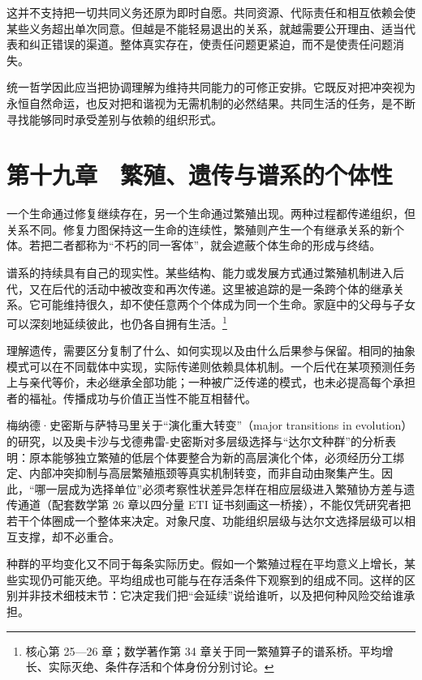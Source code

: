 \documentclass[
  11pt,
  oneside]{book}
\begin{document}
这并不支持把一切共同义务还原为即时自愿。共同资源、代际责任和相互依赖会使某些义务超出单次同意。但越是不能轻易退出的关系，就越需要公开理由、适当代表和纠正错误的渠道。整体真实存在，使责任问题更紧迫，而不是使责任问题消失。

\begingroup{}

统一哲学因此应当把协调理解为维持共同能力的可修正安排。它既反对把冲突视为永恒自然命运，也反对把和谐视为无需机制的必然结果。共同生活的任务，是不断寻找能够同时承受差别与依赖的组织形式。

\par\endgroup

\chapter{第十九章　繁殖、遗传与谱系的个体性}\label{ph-ch-19}

一个生命通过修复继续存在，另一个生命通过繁殖出现。两种过程都传递组织，但关系不同。修复力图保持这一生命的连续性，繁殖则产生一个有继承关系的新个体。若把二者都称为``不朽的同一客体''，就会遮蔽个体生命的形成与终结。

谱系的持续具有自己的现实性。某些结构、能力或发展方式通过繁殖机制进入后代，又在后代的活动中被改变和再次传递。这里被追踪的是一条跨个体的继承关系。它可能维持很久，却不使任意两个个体成为同一个生命。家庭中的父母与子女可以深刻地延续彼此，也仍各自拥有生活。\footnote{\hypertarget{ph-note-45}{}核心第 25---26 章；数学著作第 34 章关于同一繁殖算子的谱系桥。平均增长、实际灭绝、条件存活和个体身份分别讨论。}

理解遗传，需要区分复制了什么、如何实现以及由什么后果参与保留。相同的抽象模式可以在不同载体中实现，实际传递则依赖具体机制。一个后代在某项预测任务上与亲代等价，未必继承全部功能；一种被广泛传递的模式，也未必提高每个承担者的福祉。传播成功与价值正当性不能互相替代。

梅纳德·史密斯与萨特马里关于``演化重大转变''（major transitions in evolution）的研究，以及奥卡沙与戈德弗雷-史密斯对多层级选择与``达尔文种群''的分析表明：原本能够独立繁殖的低层个体要整合为新的高层演化个体，必须经历分工绑定、内部冲突抑制与高层繁殖瓶颈等真实机制转变，而非自动由聚集产生。因此，``哪一层成为选择单位''必须考察性状差异怎样在相应层级进入繁殖协方差与遗传通道（配套数学第 26 章以四分量 ETI 证书刻画这一桥接），不能仅凭研究者把若干个体圈成一个整体来决定。对象尺度、功能组织层级与达尔文选择层级可以相互支撑，却不必重合。

种群的平均变化又不同于每条实际历史。假如一个繁殖过程在平均意义上增长，某些实现仍可能灭绝。平均组成也可能与在存活条件下观察到的组成不同。这样的区别并非技术细枝末节：它决定我们把``会延续''说给谁听，以及把何种风险交给谁承担。
\end{document}
